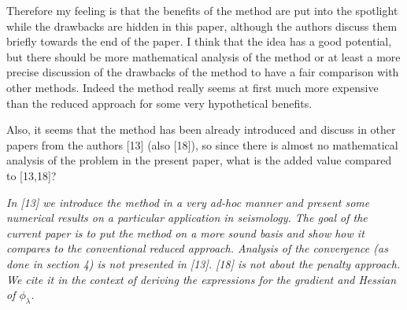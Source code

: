 \documentclass[12pt]{article}
\begin{document}
\vspace{5mm}

Therefore my feeling is that the benefits of the method are put into the spotlight while the drawbacks are hidden in this paper, although the authors discuss them briefly towards the end of the paper. I think that the idea has a good potential, but there should be more mathematical analysis of the method or at least a more precise discussion of the drawbacks of the method to have a fair comparison with other methods. Indeed the method really seems at first much more expensive than the reduced approach for some very hypothetical benefits. 

Also, it seems that the method has been already introduced and discuss in other papers from the authors [13] (also [18]), so since there is almost no mathematical analysis of the problem in the present paper, what is the added value compared to [13,18]? 

\vspace{5mm}

\emph{In [13] we introduce the method in a very ad-hoc manner and present some numerical results on a particular application in seismology. The goal of the current paper is to put the method on a more sound basis and show how it compares to the conventional reduced approach. Analysis of the convergence (as done in section 4) is not presented in [13]. [18] is not about the penalty approach. We cite it in the context of deriving the expressions for the gradient and Hessian of $\phi_{\lambda}$.}

\vspace{5mm}
\end{document}
